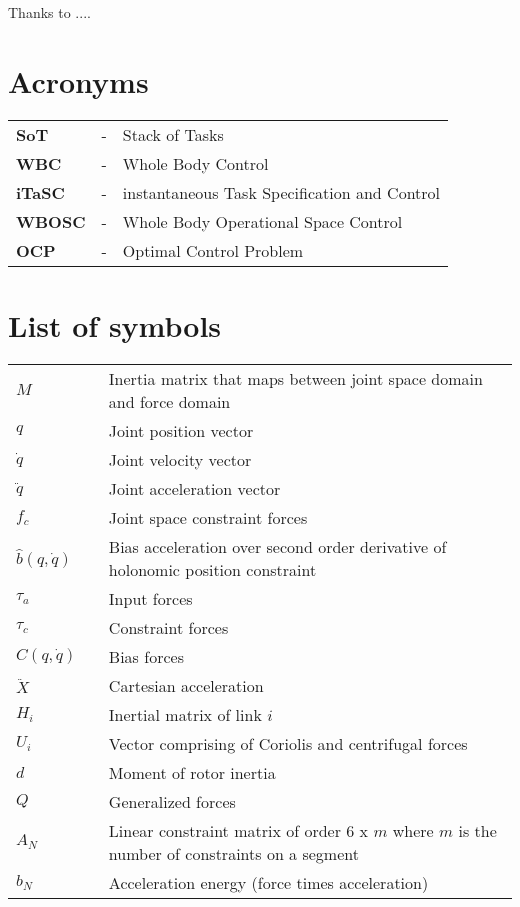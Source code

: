 \documentclass[rnd]{mas_report}
\newcommand\nomenclature[3]{#1 & #2 & #3 \\}
\begin{document}
	
	\begin{acknowledgements}
		Thanks to ....
	\end{acknowledgements}
	
	
	{\hypersetup{hidelinks}
			\tableofcontents
	}
	\listoffigures
	\listoftables

	\newpage
	\chapter*{Acronyms}
	\begin{longtable}{@{}p{2.5cm}@{}p{1cm}@{}p{\dimexpr\textwidth-1cm\relax}@{}}
		\label{sot}\nomenclature{\textbf{SoT}}{-}{Stack of Tasks}%
		\label{wbc}\nomenclature{\textbf{WBC}}{-}{Whole Body Control}%
		\label{itasc}\nomenclature{\textbf{iTaSC}}{-}{instantaneous Task Specification and Control}%
		\label{wbosc}\nomenclature{\textbf{WBOSC}}{-}{Whole Body Operational Space Control}%
		\label{ocp}\nomenclature{\textbf{OCP}}{-}{Optimal Control Problem}%
	\end{longtable}
	
	\newpage
	\chapter*{List of symbols}
	\begin{longtable}{@{}p{1.8cm}@{}p{1cm}@{}p{\dimexpr\textwidth-1cm\relax}@{}}
		\nomenclature{$M$}{}{Inertia matrix that maps between joint space domain and force domain \setstretch{1.5}} 
		\nomenclature{$q$}{}{Joint position vector}
		\nomenclature{$\dot{q}$}{}{Joint velocity vector}
		\nomenclature{$\ddot{q}$}{}{Joint acceleration vector}
		\nomenclature{$f_c$}{}{Joint space constraint forces}
		\nomenclature{$\hat{b}(q, \dot{q})$}{}{Bias acceleration over second order derivative of holonomic position constraint}
		\nomenclature{$\tau_a$}{}{Input forces}
		\nomenclature{$\tau_c$}{}{Constraint forces}
		\nomenclature{$C(q, \dot{q})$}{}{Bias forces}
		\nomenclature{$\ddot{X}$}{}{Cartesian acceleration}
		\nomenclature{$H_i$}{}{Inertial matrix of link $i$}
		\nomenclature{$U_i$}{}{Vector comprising of Coriolis and centrifugal forces}
		\nomenclature{$d$}{}{Moment of rotor inertia}
		\nomenclature{$Q$}{}{Generalized forces}
		\nomenclature{$A_N$}{}{Linear constraint matrix of order 6 x $m$ where $m$ is the number of constraints on a segment}
		\nomenclature{$b_N$}{}{Acceleration energy (force times acceleration)}	
	\end{longtable}
	
\end{document}
